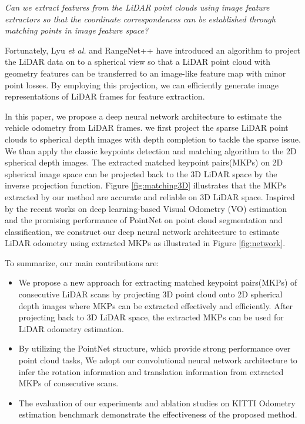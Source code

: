 \documentclass[sigconf]{acmart}
\def\etal{\emph{et al. }}
\begin{document}
\emph{Can we extract features from the LiDAR point clouds using image feature extractors so that the coordinate correspondences can be established through matching points in image feature space?}

Fortunately, Lyu \etal{} \cite{lyu2018real,lyu2018chipnet} and RangeNet++ \cite{milioto2019rangenet++} have introduced an algorithm to project the LiDAR data on to a spherical view so that a LiDAR point cloud with geometry features can be transferred to an image-like feature map with minor point losses. By employing this projection, we can efficiently generate image representations of LiDAR frames for feature extraction.

In this paper, we propose a deep neural network architecture to estimate the vehicle odometry from LiDAR frames. we first project the sparse LiDAR point clouds to spherical depth images with depth completion to tackle the sparse issue. We than apply the classic keypoints detection and matching algorithm to the 2D spherical depth images. The extracted matched keypoint pairs(MKPs) on 2D spherical image space can be projected back to the 3D LiDAR space by the inverse projection function. Figure \ref{fig:matching3D} illustrates that the MKPs extracted by our method are accurate and reliable on 3D LiDAR space. Inspired by the recent works on deep learning-based Visual Odometry (VO) estimation and the promising performance of PointNet\cite{qi2017pointnet} on point cloud segmentation and classification, we construct our deep neural network architecture to estimate LiDAR odometry using extracted MKPs as illustrated in Figure \ref{fig:network}.   

To summarize, our main contributions are:
\begin{itemize}
\item We propose a new approach for extracting matched keypoint pairs(MKPs) of consecutive LiDAR scans by projecting 3D point cloud onto 2D spherical depth images where MKPs can be extracted effectively and efficiently. After projecting back to 3D LiDAR space, the extracted MKPs can be used for LiDAR odometry estimation. 
\item By utilizing the PointNet structure, which provide strong performance over point cloud tasks, We adopt our convolutional neural network architecture to infer the rotation information and translation information from extracted MKPs of consecutive scans.
\item The evaluation of our experiments and ablation studies on KITTI Odometry estimation benchmark\cite{kitti} demonstrate the effectiveness of the proposed method. 
\end{itemize}
\end{document}
